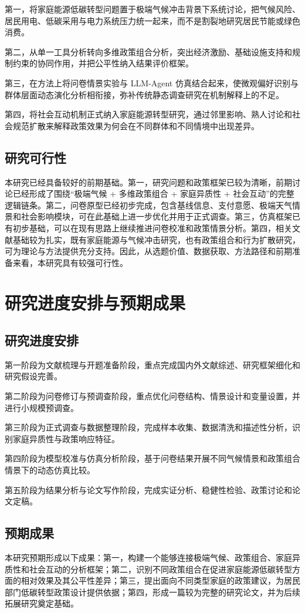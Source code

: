 \documentclass[12pt,a4paper]{ctexart}
\begin{document}
第一，将家庭能源低碳转型问题置于极端气候冲击背景下系统讨论，把气候风险、居民用电、低碳采用与电力系统压力统一起来，而不是割裂地研究居民节能或绿色消费。

第二，从单一工具分析转向多维政策组合分析，突出经济激励、基础设施支持和规制约束的协同作用，并把公平性纳入结果评价框架。

第三，在方法上将问卷情景实验与 LLM-Agent 仿真结合起来，使微观偏好识别与群体层面动态演化分析相衔接，弥补传统静态调查研究在机制解释上的不足。

第四，将社会互动机制正式纳入家庭能源转型研究，通过邻里影响、熟人讨论和社会规范扩散来解释政策效果为何会在不同群体和不同情境中出现差异。

\subsection{研究可行性}
本研究已经具备较好的前期基础。第一，研究问题和政策框架已较为清晰，前期讨论已经形成了围绕“极端气候 + 多维政策组合 + 家庭异质性 + 社会互动”的完整逻辑链条。第二，问卷原型已经初步完成，包含基线信息、支付意愿、极端天气情景和社会影响模块，可在此基础上进一步优化并用于正式调查。第三，仿真框架已有初步基础，可以在现有思路上继续推进问卷校准和政策情景分析。第四，相关文献基础较为扎实，既有家庭能源与气候冲击研究，也有政策组合和行为扩散研究，可为理论与方法提供充分支持。因此，从选题价值、数据获取、方法路径和前期准备来看，本研究具有较强可行性。

\section{研究进度安排与预期成果}
\subsection{研究进度安排}
第一阶段为文献梳理与开题准备阶段，重点完成国内外文献综述、研究框架细化和研究假设完善。

第二阶段为问卷修订与预调查阶段，重点优化问卷结构、情景设计和变量设置，并进行小规模预调查。

第三阶段为正式调查与数据整理阶段，完成样本收集、数据清洗和描述性分析，识别家庭异质性与政策响应特征。

第四阶段为模型校准与仿真分析阶段，基于问卷结果开展不同气候情景和政策组合情景下的动态仿真比较。

第五阶段为结果分析与论文写作阶段，完成实证分析、稳健性检验、政策讨论和论文定稿。

\subsection{预期成果}
本研究预期形成以下成果：第一，构建一个能够连接极端气候、政策组合、家庭异质性和社会互动的分析框架；第二，识别不同政策组合在促进家庭能源低碳转型方面的相对效果及其公平性差异；第三，提出面向不同类型家庭的政策建议，为居民部门低碳转型政策设计提供依据；第四，形成一篇较为完整的研究论文，并为后续拓展研究奠定基础。
\end{document}
